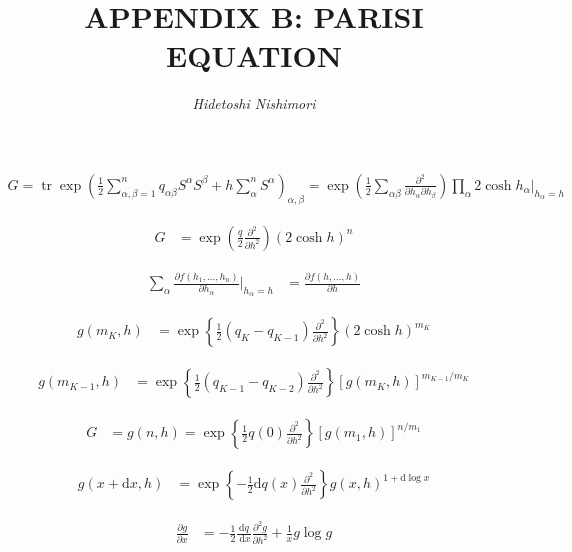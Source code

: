 \documentclass{article}
\title{\LARGE\scshape\MakeUppercase{Appendix B: Parisi equation}}
\author{\textit{Hidetoshi Nishimori}}
\date{}
\begin{document}
\maketitle

\begin{align*}
G = \operatorname{tr} \exp \left(\frac{1}{2} \sum_{\alpha, \beta=1}^{n} q_{\alpha \beta} S^{\alpha} S^{\beta} + h \sum_{\alpha}^{n} S^{\alpha}\right)_{\alpha, \beta} = \exp \left(\frac{1}{2} \sum_{\alpha \beta} \frac{\partial^{2}}{\partial h_{\alpha} \partial h_{\beta}}\right) \prod_{\alpha} 2 \cosh h_{\alpha}\bigg|_{h_{\alpha}=h}
\tag{B.1}
\end{align*}

\begin{align*}
G &= \exp \left(\frac{q}{2} \frac{\partial^{2}}{\partial h^{2}}\right)(2 \cosh h)^{n} 
\tag{B.2}
\end{align*}

\begin{align*}
\sum_{\alpha} \frac{\partial f\left(h_1, \ldots, h_n\right)}{\partial h_{\alpha}}\bigg|_{h_{\alpha}=h} &= \frac{\partial f(h, \ldots, h)}{\partial h}
\tag{B.3}
\end{align*}

\begin{align*}
g(m_K, h) &= \exp \left\{\frac{1}{2}\left(q_K - q_{K-1}\right) \frac{\partial^{2}}{\partial h^{2}}\right\} (2 \cosh h)^{m_K} 
\tag{B.4}
\end{align*}

\begin{align*}
g(m_{K-1}, h) &= \exp \left\{\frac{1}{2}\left(q_{K-1} - q_{K-2}\right) \frac{\partial^{2}}{\partial h^{2}}\right\} \left[g(m_K, h)\right]^{m_{K-1} / m_K}
\tag{B.5}
\end{align*}

\begin{align*}
G &= g(n, h) = \exp \left\{\frac{1}{2} q(0) \frac{\partial^{2}}{\partial h^{2}}\right\} \left[g(m_1, h)\right]^{n / m_1}
\tag{B.6}
\end{align*}

\begin{align*}
g(x + \mathrm{d} x, h) &= \exp \left\{-\frac{1}{2} \mathrm{d} q(x) \frac{\partial^{2}}{\partial h^{2}}\right\} g(x, h)^{1 + \mathrm{d} \log x}
\tag{B.7}
\end{align*}

\begin{align*}
\frac{\partial g}{\partial x} &= -\frac{1}{2} \frac{\mathrm{d} q}{\mathrm{~d} x} \frac{\partial^{2} g}{\partial h^{2}} + \frac{1}{x} g \log g 
\tag{B.8}
\end{align*}
\end{document}
